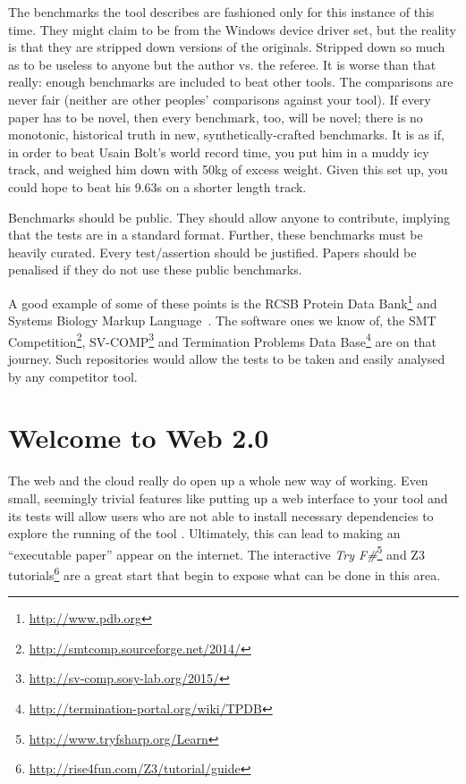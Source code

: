\documentclass[10pt,conference,final]{IEEEtran}
\begin{document}
The benchmarks the tool describes are fashioned only for this instance
of this time. They might claim to be from the Windows device driver
set, but the reality is that they are stripped down versions of the
originals. Stripped down so much as to be useless to anyone but the
author vs. the referee. It is worse than that really: enough
benchmarks are included to beat other tools. The comparisons are never
fair (neither are other peoples' comparisons against your tool). If
every paper has to be novel, then every benchmark, too, will be novel;
there is no monotonic, historical truth in new, synthetically-crafted
benchmarks. It is as if, in order to beat Usain Bolt's world record
time, you put him in a muddy icy track, and weighed him down with 50kg
of excess weight. Given this set up, you could hope to beat his 9.63s
on a shorter length track.

Benchmarks should be public. They should allow anyone to contribute,
implying that the tests are in a standard format. Further, these
benchmarks must be heavily curated. Every test/assertion should be
justified. Papers should be penalised if they do not use these public
benchmarks.

A good example of some of these points is the RCSB Protein Data
Bank\footnote{\url{http://www.pdb.org}} and Systems Biology Markup
Language~\cite{Chaouiya2013}. The software ones we know of,
the SMT
Competition\footnote{\url{http://smtcomp.sourceforge.net/2014/}},
SV-COMP\footnote{\url{http://sv-comp.sosy-lab.org/2015/}} and
Termination Problems Data
Base\footnote{\url{http://termination-portal.org/wiki/TPDB}} are on
that journey. Such repositories would allow the tests to be taken and
easily analysed by any competitor tool.

\section{Welcome to Web 2.0} 

The web and the cloud really do open up a whole new way of
working. Even small, seemingly trivial features like putting up a web
interface to your tool and its tests will allow users who are not able
to install necessary dependencies to explore the running of the tool
\cite{Hall2014}. Ultimately, this can lead to making an ``executable
paper'' appear on the internet. The interactive {\em Try
F\#}\footnote{\url{http://www.tryfsharp.org/Learn}} and Z3
tutorials\footnote{\url{http://rise4fun.com/Z3/tutorial/guide}} are a
great start that begin to expose what can be done in this area.
\end{document}
